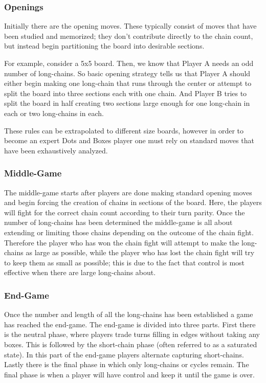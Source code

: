 \documentclass[12pt,twoside]{reedthesis}
\begin{document}
\subsubsection{Openings}
Initially there are the opening moves.  These typically consist of moves that have been studied and memorized; they don't contribute directly to the chain count, but instead begin partitioning the board into desirable sections.  

For example, consider a 5x5 board.  Then, we know that Player A needs an odd number of long-chains.  So basic opening strategy tells us that Player A should either begin making one long-chain that runs through the center or attempt to split the board into three sections each with one chain.  And Player B tries to split the board in half creating two sections large enough for one long-chain in each or two long-chains in each.  

These rules can be extrapolated to different size boards, however in order to become an expert Dots and Boxes player one must rely on standard moves that have been exhaustively analyzed.

\subsubsection{Middle-Game}
The middle-game starts after players are done making standard opening moves and begin forcing the creation of chains in sections of the board.  Here, the players will fight for the correct chain count according to their turn parity.  Once the number of long-chains has been determined the middle-game is all about extending or limiting those chains depending on the outcome of the chain fight.  Therefore the player who has won the chain fight will attempt to make the long-chains as large as possible, while the player who has lost the chain fight will try to keep them as small as possible; this is due to the fact that control is most effective when there are large long-chains about.

\subsubsection{End-Game}
Once the number and length of all the long-chains has been established a game has reached the end-game.  The end-game is divided into three parts.  First there is the neutral phase, where players trade turns filling in edges without taking any boxes.  This is followed by the short-chain phase (often referred to as a saturated state).  In this part of the end-game players alternate capturing short-chains.  Lastly there is the final phase in which only long-chains or cycles remain.  The final phase is when a player will have control and keep it until the game is over.
\end{document}
